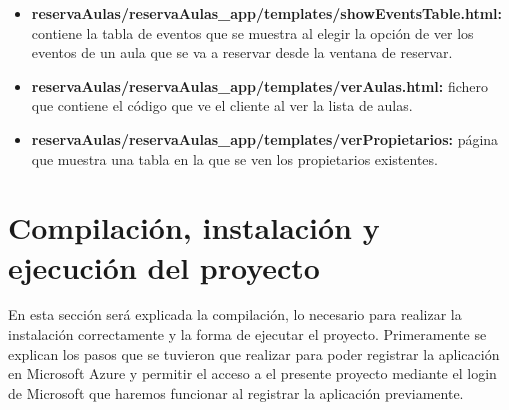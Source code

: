 \begin{itemize}
    \item \textbf{reservaAulas/reservaAulas\_app/templates/showEventsTable.html:} contiene la tabla de eventos que se muestra al elegir la opción de ver los eventos de un aula que se va a reservar desde la ventana de reservar.
    \item \textbf{reservaAulas/reservaAulas\_app/templates/verAulas.html:} fichero que contiene el código que ve el cliente al ver la lista de aulas.
    \item \textbf{reservaAulas/reservaAulas\_app/templates/verPropietarios:} página que muestra una tabla en la que se ven los propietarios existentes.
\end{itemize}


\section{Compilación, instalación y ejecución del proyecto}
En esta sección será explicada la compilación, lo necesario para realizar la instalación correctamente y la forma de ejecutar el proyecto. Primeramente se explican los pasos que se tuvieron que realizar para poder registrar la aplicación en Microsoft Azure y permitir el acceso a el presente proyecto mediante el login de Microsoft que haremos funcionar al registrar la aplicación previamente.\newline

